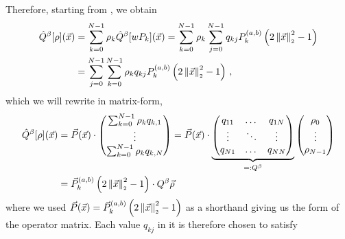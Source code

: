 Therefore, starting from , we obtain
\begin{align*}
  \hat{Q}^\beta[\rho](\vec{x}) & = \sum_{k=0}^{N-1} \rho_k \hat{Q}^\beta[wP_k](\vec{x}) = \sum_{k=0}^{N-1} \rho_k \sum_{j=0}^{N-1} q_{kj} P_{k}^{(a, b)}\left(2 \left\lVert\vec{x}\right\rVert_{\scriptscriptstyle 2}^2 - 1\right) \\
                               & = \sum_{j=0}^{N-1} \sum_{k=0}^{N-1} \rho_k q_{kj} P_{k}^{(a, b)}\left(2 \left\lVert\vec{x}\right\rVert_{\scriptscriptstyle 2}^2 - 1\right)\,,
\end{align*}
which we will rewrite in matrix-form,
\begin{align*}
  \hat{Q}^\beta[\rho](\vec{x}) & = \vec{P}(\vec{x}) \cdot
  \begin{pmatrix}
    \sum_{k=0}^{N-1} \rho_k q_{k,1} \\
    \vdots                          \\
    \sum_{k=0}^{N-1} \rho_k q_{k,N}
  \end{pmatrix} = \vec{P}(\vec{x}) \cdot
  \underbrace{
    \begin{pmatrix}
      q_{11} & \dots  & q_{1N} \\
      \vdots & \ddots & \vdots \\
      q_{N1} & \dots  & q_{NN} \\
    \end{pmatrix}
  }_{=: Q^\beta}
  \begin{pmatrix}
    \rho_0 \\
    \vdots \\
    \rho_{N-1}
  \end{pmatrix}                                                          \\
                               & = \vec{P}_{k}^{(a, b)}\left(2 \left\lVert\vec{x}\right\rVert_{\scriptscriptstyle 2}^2 - 1\right) \cdot Q^\beta \vec{\rho}
\end{align*}
where we used $\vec{P}(\vec{x}) = \vec{P}_{k}^{(a, b)}\left(2 \left\lVert\vec{x}\right\rVert_{\scriptscriptstyle 2}^2 - 1\right)$ as a shorthand
giving us the form of the operator matrix.
Each value $q_{kj}$ in it is therefore chosen to satisfy
